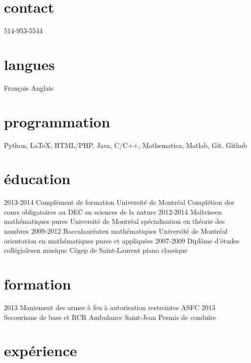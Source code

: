 \documentclass{cv-friggeri}  %
\begin{document}
\begin{aside} %
\section{contact}
514-953-5544
\section{langues}
Français
Anglais
\section{programmation}
Python,
\LaTeX{}, HTML/PHP,
Java, C/C++,
Mathematica, Matlab,
Git, Github
\end{aside}


\section{éducation}


\begin{entrylist}
\entryetc
{2013-2014}
{}{Complément de formation}
{Université de Montréal}
{Complétion des cours obligatoires au DEC en sciences de la nature}
\entryetc
{2012-2014}
{Maîtrise}{en mathématiques pures}
{Université de Montréal}
{spécialisation en théorie des nombres}
\entryetc
{2009-2012}
{Baccalauréat}{en mathématiques}
{Université de Montréal}
{orientation en mathématiques pures et appliquées}
\entryetc
{2007-2009}
{Diplôme d'études collégiales}{en musique}
{Cégep de Saint-Laurent}
{piano classique}
\end{entrylist}


\section{formation}


\begin{entrylist}
\entry
{2013}
{}{Maniement des armes à feu à autorisation restreintes} %
{ASFC}
\entry
{2013}
{}{Secourisme de base et RCR}
{Ambulance Saint-Jean}
\entry
{}
{}{Permis de conduire} %
{}
\end{entrylist}


\section{expérience}
\end{document}
